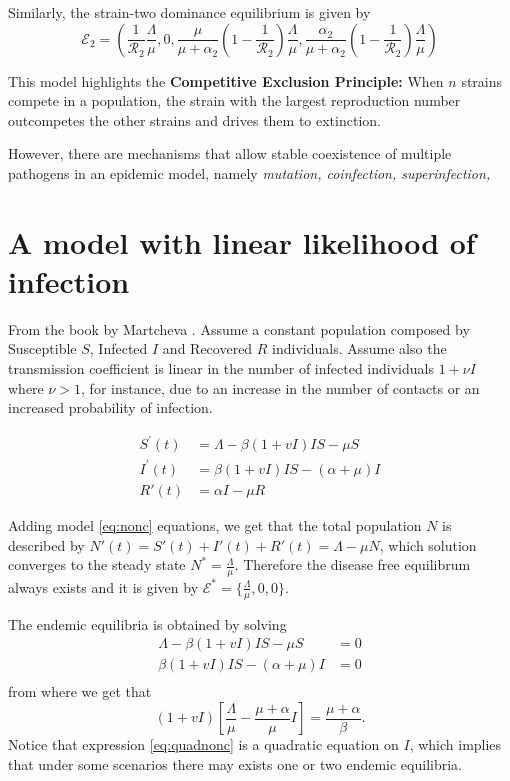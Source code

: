 \documentclass{book}\usepackage[]{graphicx}\usepackage[]{color}
\begin{document}
Similarly, the strain-two dominance equilibrium is given by
\begin{equation}
\mathscr{E}_{2}=\left(\frac{1}{\mathscr{R}_{2}} \frac{\Lambda}{\mu}, 0, \frac{\mu}{\mu+\alpha_{2}}\left(1-\frac{1}{\mathscr{R}_{2}}\right) \frac{\Lambda}{\mu}, \frac{\alpha_{2}}{\mu+\alpha_{2}}\left(1-\frac{1}{\mathscr{R}_{2}}\right) \frac{\Lambda}{\mu}\right)
\end{equation}

This model highlights the {\bf Competitive Exclusion Principle:} When $n$ strains compete in a population, the strain with the largest reproduction number outcompetes the other strains and drives them to extinction.

However, there are mechanisms that allow stable coexistence of multiple pathogens in an epidemic model, namely {\it mutation, coinfection, superinfection, } 

\section{A model with linear likelihood of infection}

From the book by Martcheva \cite{martcheva2015introduction}. Assume a constant population composed by Susceptible $S$, Infected $I$ and Recovered $R$ individuals. Assume also the transmission coefficient is linear in the number of infected individuals $1+\nu I$ where $\nu>1$, for instance, due to an increase in the number of contacts or an increased probability of infection.

\begin{align} \label{eq:nonc}
\nonumber S^{\prime}(t) &=\Lambda-\beta(1+v I) I S-\mu S\\
I^{\prime}(t) &=\beta(1+v I) I S-(\alpha+\mu) I\\
\nonumber R'(t)&=\alpha I-\mu R
\end{align}

Adding model \eqref{eq:nonc} equations, we get that the total population $N$ is described by $N'(t)=S'(t)+I'(t)+R'(t)=\Lambda-\mu N$, which solution converges to the steady state $N^*=\frac{\Lambda}{\mu}$. Therefore the disease free equilibrum always exists and it is given by $\mathcal{E}^*=\{ \frac{\Lambda}{\mu},0,0 \}$.

The endemic equilibria is obtained by solving 
\begin{align} \label{eq:endnonc}
\Lambda-\beta(1+v I) I S-\mu S&=0\\
\beta(1+v I) I S-(\alpha+\mu) I&=0\\
\end{align}
from where we get that
\begin{equation} \label{eq:quadnonc}
(1+v I)\left[\frac{\Lambda}{\mu}-\frac{\mu+\alpha}{\mu} I\right]=\frac{\mu+\alpha}{\beta}.
\end{equation}
Notice that expression \eqref{eq:quadnonc} is a quadratic equation on $I$, which implies that under some scenarios there may exists one or two endemic equilibria.
\end{document}
